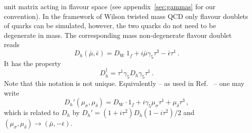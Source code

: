 unit matrix acting in flavour space (see appendix~\ref{sec:gammas} for
our convention). In the framework of Wilson twisted mass QCD only
flavour doublets of quarks can be simulated, however, the two quarks
do not need to be degenerate in mass. The corresponding mass
non-degenerate flavour doublet reads~\cite{Frezzotti:2003xj}
\begin{equation}
  \label{eq:Dh}
  D_h(\bar\mu, \bar\epsilon)  = D_\mathrm{W}\ 1_f +
  i\bar\mu\gamma_5\tau^3 - \bar\epsilon \tau^1 \, .
\end{equation}
It has the property
\[
D_h^\dagger = \tau^1\gamma_5 D_h \gamma_5 \tau^1\,.
\]
Note that this notation is not unique. Equivalently -- as used in
Ref.~\cite{Chiarappa:2006ae} -- one may write
\begin{equation}
  \label{eq:altDh}
  D_h'(\mu_\sigma,\mu_\delta) = D_\mathrm{W}\cdot 1_f +
  i\gamma_5\mu_\sigma\tau^1 + \mu_\delta \tau^3\, ,
\end{equation}
which is related to $D_h$ by $D_h' = (1+i\tau^2)D_h(1-i\tau^2)/2$
and $(\mu_\sigma,\mu_\delta)\to(\bar\mu, -\bar\epsilon)$. 


